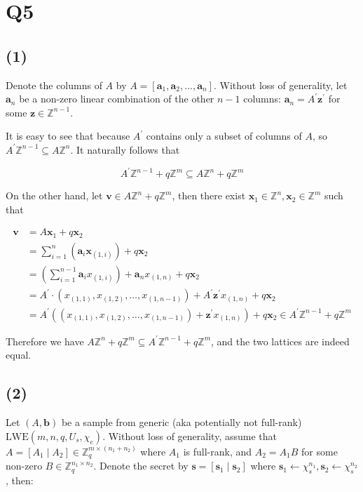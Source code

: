 \documentclass{article}
\begin{document}
\newpage

\section*{Q5}
\subsection*{(1)}
Denote the columns of $A$ by $A = [\mathbf{a}_1, \mathbf{a}_2, \ldots, \mathbf{a}_n]$. Without loss of generality, let $\mathbf{a}_n$ be a non-zero linear combination of the other $n-1$ columns: $\mathbf{a}_n = A^\prime \mathbf{z}^\prime$ for some $\mathbf{z} \in \mathbb{Z}^{n-1}$.

It is easy to see that because $A^\prime$ contains only a subset of columns of $A$, so $A^\prime\mathbb{Z}^{n-1} \subseteq A\mathbb{Z}^n$. It naturally follows that

$$
A^\prime\mathbb{Z}^{n-1} + q\mathbb{Z}^m \subseteq A\mathbb{Z}^n + q\mathbb{Z}^m
$$


On the other hand, let $\mathbf{v} \in A \mathbb{Z}^{n} + q\mathbb{Z}^m$, then there exist $\mathbf{x}_1 \in \mathbb{Z}^n, \mathbf{x}_2 \in \mathbb{Z}^m$ such that 

$$
\begin{aligned}
\mathbf{v} &= A\mathbf{x}_1 + q\mathbf{x}_2 \\
&= \sum_{i=1}^n(\mathbf{a}_i \mathbf{x}_{(1, i)}) + q\mathbf{x}_2 \\
&= (\sum_{i=1}^{n-1}\mathbf{a}_i x_{(1, i)}) + \mathbf{a}_n x_{(1, n)} + q\mathbf{x}_2 \\
&= A^\prime \cdot (x_{(1, 1)}, x_{(1, 2)}, \ldots, x_{(1, n-1)}) + A^\prime\mathbf{z}^\prime x_{(1, n)} + q\mathbf{x}_2 \\
&= A^\prime((x_{(1, 1)}, x_{(1, 2)}, \ldots, x_{(1, n-1)}) + \mathbf{z}^\prime x_{(1, n)}) + q\mathbf{x}_2 \in A^\prime\mathbb{Z}^{n-1} + q\mathbb{Z}^m
\end{aligned}
$$

Therefore we have $A\mathbb{Z}^{n} + q\mathbb{Z}^m \subseteq A^\prime\mathbb{Z}^{n-1} + q\mathbb{Z}^m$, and the two lattices are indeed equal.

\subsection*{(2)}
Let $(A, \mathbf{b})$ be a sample from generic (aka potentially not full-rank) $\text{LWE}(m, n, q, U_s, \chi_e)$. Without loss of generality, assume that $A = [A_1 \mid A_2] \in \mathbb{Z}_q^{m \times (n_1 + n_2)}$ where $A_1$ is full-rank, and $A_2 = A_1B$ for some non-zero $B \in \mathbb{Z}_q^{n_1 \times n_2}$. Denote the secret by $\mathbf{s} = [\mathbf{s}_1 \mid \mathbf{s}_2]$ where $\mathbf{s}_1 \leftarrow \chi_s^{n_1}, \mathbf{s}_2 \leftarrow \chi_s^{n_2}$, then:
\end{document}
